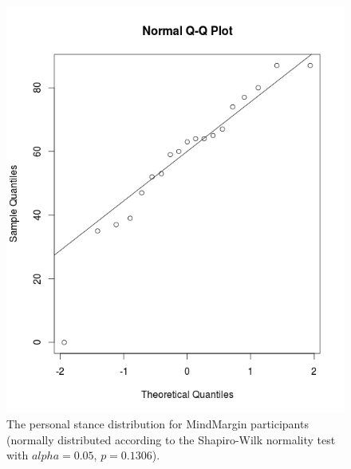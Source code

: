 \begin{figure}
\centering
\includegraphics[scale=0.25]{mm_normal.png}
\caption{The personal stance distribution for MindMargin participants (normally distributed according to the Shapiro-Wilk normality test with $alpha=0.05$, $p=0.1306$).}
\label{fig:mm_normal}
\end{figure}


